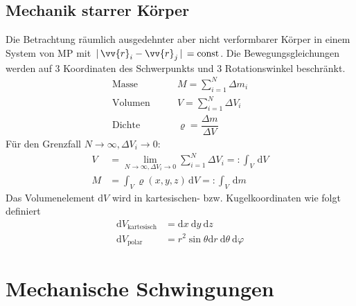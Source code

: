 \documentclass[a4paper,12pt]{article}
\newcommand{\td}{\,\text{d}}
\begin{document}
\subsection{Mechanik starrer Körper}
Die Betrachtung räumlich ausgedehnter aber nicht verformbarer Körper in einem System von MP mit $\,|\, \vv{r}_i-\vv{r}_j\,|\, =\text{const}$. Die Bewegungsgleichungen werden auf 3 Koordinaten des Schwerpunkts und 3 Rotationswinkel beschränkt.
\begin{align*}
        \text{Masse}&\qquad M=\sum_{i=1}^{N}\Delta m_i\\
        \text{Volumen}&\qquad V=\sum_{i=1}^{N}\Delta V_i\\
        \text{Dichte}&\qquad \varrho=\dfrac{\Delta m}{\Delta V}
\end{align*}
Für den Grenzfall $N\rightarrow \infty,\Delta V_i\rightarrow 0$:
\begin{align*}
        V&=\lim_{N\rightarrow \infty,\Delta V_i\rightarrow 0}\sum_{i=1}^{N}\Delta V_i=:\int_{V}^{}\td V\\
        M&=\int_{V}^{}\varrho\left(x,y,z\right)\td V=:\int_{V}^{}\td m
\end{align*}
Das Volumenelement $\text{d}V$ wird in kartesischen- bzw. Kugelkoordinaten wie folgt definiert
\begin{align*}
        \text{d}V_{\text{kartesisch}}&=\text{d}x\ \text{d}y\ \text{d}z\\
        \text{d}V_{\text{polar}}&=r^2\sin \theta \text{d}r\ \text{d}\theta\ \text{d}\varphi 
\end{align*}

\section{Mechanische Schwingungen}
\end{document}
